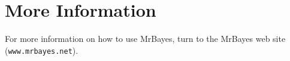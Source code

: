 \documentclass[12pt]{book}
\newcommand{\ttt}[1]{\texttt{#1}}
\newcommand{\tb}[1]{\ttt{\textbf{#1}}}
\begin{document}

\section{More Information}
For more information on how to use MrBayes, turn to the MrBayes web site
(\ttt{www.mrbayes.net}).
\end{document}
